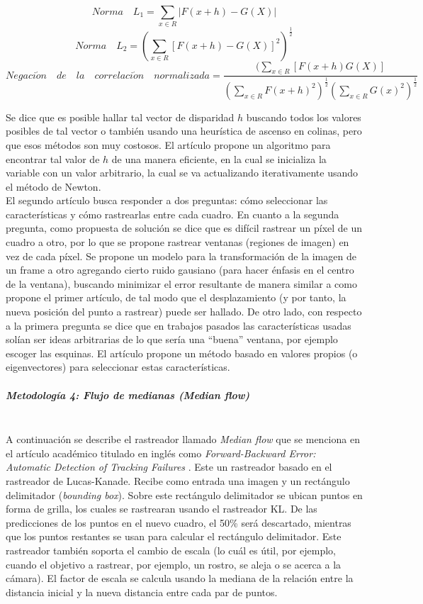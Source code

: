 \documentclass[a4paper,openright,12pt]{report}
\begin{document}
$$Norma \quad L_{1} = \sum_{x\in R} |F(x+h) - G(X)|$$
$$Norma \quad L_{2} = (\sum_{x\in R} [F(x+h) - G(X)]^2)^\frac{1}{2}$$
$$Negaci\acute on\quad de \quad	la \quad correlaci\acute on \quad normalizada =
    \frac{(\sum_{x\in R} [F(x+h)G(X)]}
         {(\sum_{x\in R} F(x+h)^2)^\frac{1}{2}
          (\sum_{x\in R} G(x)^2)^\frac{1}{2}}$$

Se dice que es posible hallar tal vector de disparidad $h$ buscando todos los
valores posibles de tal vector o también usando una heurística de ascenso en
colinas, pero que esos métodos son muy costosos. El artículo propone un
algoritmo para encontrar tal valor de $h$ de una manera eficiente, en la cual
se inicializa la variable con un valor arbitrario, la cual se va actualizando
iterativamente usando el método de Newton.\\
El segundo artículo busca responder a dos preguntas: cómo seleccionar las
características y cómo rastrearlas entre cada cuadro. En cuanto a la segunda
pregunta, como propuesta de solución se dice que es difícil rastrear un píxel
de un cuadro a otro, por lo que se propone rastrear ventanas (regiones de
imagen) en vez de cada píxel. Se propone un modelo para la transformación de
la imagen de un frame a otro agregando cierto ruido gausiano (para hacer
énfasis en el centro de la ventana), buscando minimizar el error resultante de
manera similar a como propone el primer artículo, de tal modo que el
desplazamiento (y por tanto, la nueva posición del punto a rastrear) puede ser
hallado. De otro lado, con respecto a la primera pregunta se dice que en
trabajos pasados las características usadas solían ser ideas arbitrarias de lo
que sería una ``buena'' ventana, por ejemplo escoger las esquinas. El artículo
propone un método basado en valores propios (o eigenvectores) para seleccionar
estas características.\\

\subparagraph{Metodología 4: Flujo de medianas (\textit{Median flow})} \label{para:medianflow}
\mbox{} \\
A continuación se describe el rastreador llamado \textit{Median flow} que se
menciona en el artículo académico titulado en inglés como
\textit{Forward-Backward Error: Automatic Detection of Tracking Failures}
\cite{kalal2010forward}.
Este un rastreador basado en el rastreador de Lucas-Kanade. Recibe como
entrada una imagen y un rectángulo delimitador (\textit{bounding box}). Sobre
este rectángulo delimitador se ubican puntos en forma de grilla, los cuales se
rastrearan usando el rastreador KL. De las predicciones de los puntos en el
nuevo cuadro, el 50\% será descartado, mientras que los puntos restantes se usan
para calcular el rectángulo delimitador. Este rastreador también soporta el
cambio de escala (lo cuál es útil, por ejemplo, cuando el objetivo a rastrear,
por ejemplo, un rostro, se aleja o se acerca a la cámara). El factor de escala
se calcula usando la mediana de la relación entre la distancia inicial y la
nueva distancia entre cada par de puntos.
\end{document}
